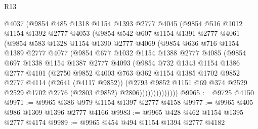 \begin{lexlean}{R13}
\begin{coremodule}
            @4037
            (@9854
              @485
              @1318
              @1154
              @1393
              @2777
              @4045
              (@9854
                @516
                @1012
                @1154
                @1392
                @2777
                @4053
                (@9854
                  @542
                  @607
                  @1154
                  @1391
                  @2777
                  @4061
                  (@9854
                    @583
                    @1328
                    @1154
                    @1390
                    @2777
                    @4069
                    (@9854
                      @636
                      @716
                      @1154
                      @1389
                      @2777
                      @4077
                      (@9854
                        @677
                        @1032
                        @1154
                        @1388
                        @2777
                        @4085
                        (@9854
                          @697
                          @1338
                          @1154
                          @1387
                          @2777
                          @4093
                          (@9854
                            @732
                            @1343
                            @1154
                            @1386
                            @2777
                            @4101
                            (@2750
                              @9852
                              @4003
                              @763
                              @362
                              @1154
                              @1385
                              @1702
                              @9852
                              @2777
                              @4114
                              (@2641 (@4117 @9852))
                              (@2793
                                @9852
                                @1151
                                @69
                                @374
                                @2529
                                @2529
                                @1702
                                @2776
                                (@2803 @9852)
                                @2806))))))))))))))
@9965 := @9725 @4150
@9971 := @9965 @386 @979 @1154 @1397 @2777 @4158
@9977 := @9965 @405 @986 @1309 @1396 @2777 @4166
@9983 := @9965 @428 @462 @1154 @1395 @2777 @4174
@9989 := @9965 @454 @494 @1154 @1394 @2777 @4182

\end{coremodule}
\end{lexlean}
